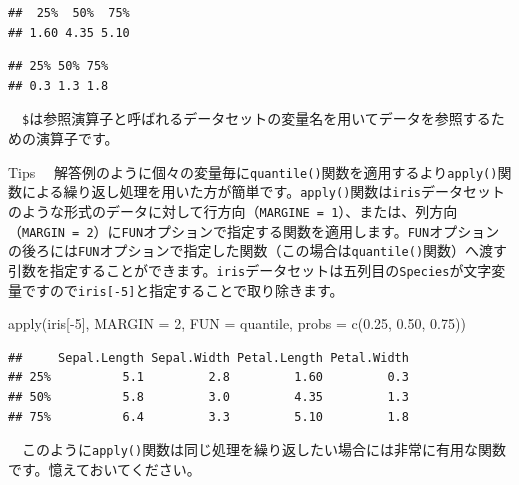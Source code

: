 \documentclass[
  12pt,
]{book}
\newenvironment{Shaded}{\begin{snugshade}}{\end{snugshade}}
\newcommand{\AttributeTok}[1]{\textcolor[rgb]{0.77,0.63,0.00}{#1}}
\newcommand{\DecValTok}[1]{\textcolor[rgb]{0.00,0.00,0.81}{#1}}
\newcommand{\FloatTok}[1]{\textcolor[rgb]{0.00,0.00,0.81}{#1}}
\newcommand{\FunctionTok}[1]{\textcolor[rgb]{0.00,0.00,0.00}{#1}}
\newcommand{\NormalTok}[1]{#1}
\newcommand{\SpecialCharTok}[1]{\textcolor[rgb]{0.00,0.00,0.00}{#1}}
\begin{document}
\begin{verbatim}
##  25%  50%  75% 
## 1.60 4.35 5.10
\end{verbatim}

\begin{Shaded}
\end{Shaded}

\begin{verbatim}
## 25% 50% 75% 
## 0.3 1.3 1.8
\end{verbatim}

　\texttt{\$}は参照演算子と呼ばれるデータセットの変量名を用いてデータを参照するための演算子です。

\begin{info-box}{Tips}
　解答例のように個々の変量毎に\texttt{quantile()}関数を適用するより\texttt{apply()}関数による繰り返し処理を用いた方が簡単です。\texttt{apply()}関数は\texttt{iris}データセットのような形式のデータに対して行方向（\texttt{MARGINE\ =\ 1}）、または、列方向（\texttt{MARGIN\ =\ 2}）に\texttt{FUN}オプションで指定する関数を適用します。\texttt{FUN}オプションの後ろには\texttt{FUN}オプションで指定した関数（この場合は\texttt{quantile()}関数）へ渡す引数を指定することができます。\texttt{iris}データセットは五列目の\texttt{Species}が文字変量ですので\texttt{iris{[}-5{]}}と指定することで取り除きます。

\begin{Shaded}
\begin{Highlighting}[numbers=left,,]
\FunctionTok{apply}\NormalTok{(iris[}\SpecialCharTok{{-}}\DecValTok{5}\NormalTok{], }\AttributeTok{MARGIN =} \DecValTok{2}\NormalTok{, }\AttributeTok{FUN =}\NormalTok{ quantile,}
      \AttributeTok{probs =} \FunctionTok{c}\NormalTok{(}\FloatTok{0.25}\NormalTok{, }\FloatTok{0.50}\NormalTok{, }\FloatTok{0.75}\NormalTok{))}
\end{Highlighting}
\end{Shaded}

\begin{verbatim}
##     Sepal.Length Sepal.Width Petal.Length Petal.Width
## 25%          5.1         2.8         1.60         0.3
## 50%          5.8         3.0         4.35         1.3
## 75%          6.4         3.3         5.10         1.8
\end{verbatim}

　このように\texttt{apply()}関数は同じ処理を繰り返したい場合には非常に有用な関数です。憶えておいてください。

\end{info-box}
\end{document}
